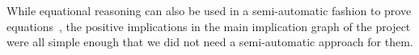 While equational reasoning can also be used in a semi-automatic fashion to prove equations~\cite{DBLP:journals/pacmpl/KoehlerGBGTS24}, the positive implications in the main implication graph of the project were all simple enough that we did not need a semi-automatic approach for them.









